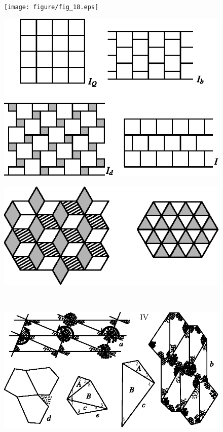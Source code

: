 \begin{figure}[H]
\centering
\texttt{[image: figure/fig\_18.eps]}
\caption{}\label{chap6-fig18}
\end{figure}

\begin{figure}[H]
\centering
\includegraphics[scale=.9]{figure/fig_19.eps}
\caption{}\label{chap6-fig19}
\end{figure}

\begin{figure}[H]
\centering
\includegraphics[scale=.9]{figure/fig_20.eps}
\caption{}\label{chap6-fig20}
\end{figure}

\newpage

~\phantom{a}

\vfill

\begin{figure}[H]
\centering
\includegraphics[scale=.95]{figure/fig_21.eps}
\caption{}\label{chap6-fig21}
\end{figure}

